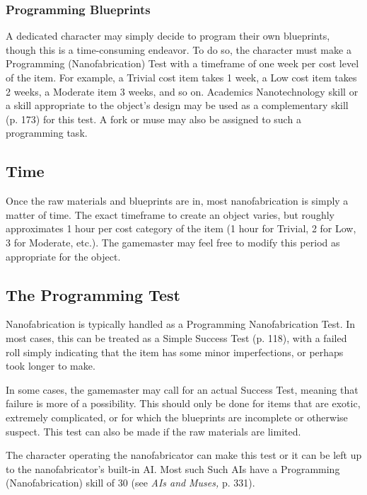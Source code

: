 \subsubsection{Programming Blueprints}

A dedicated character may simply decide to program 
their own blueprints, though this is a time-consuming 
endeavor. To do so, the character must make a Programming
(Nanofabrication) Test with a timeframe
of one week per cost level of the item. For example, a 
Trivial cost item takes 1 week, a Low cost item takes 2 
weeks, a Moderate item 3 weeks, and so on. Academics
Nanotechnology skill or a skill appropriate to the
object's design may be used as a complementary skill 
(p. 173) for this test. A fork or muse may also be assigned
to such a programming task.

\subsection{Time}

Once the raw materials and blueprints are in, most nanofabrication
is simply a matter of time. The exact timeframe to create an
object varies, but roughly approximates 1 hour per cost category of 
the item (1 hour for Trivial, 2 for Low, 3 for Moderate, etc.). The 
gamemaster may feel free to modify this period as appropriate for 
the object.

\subsection{The Programming Test}

Nanofabrication is typically handled as a Programming Nanofabrication
Test. In most cases, this can be treated as a Simple Success
Test (p. 118), with a failed roll simply indicating that the item has 
some minor imperfections, or perhaps took longer to make.

In some cases, the gamemaster may call for an actual Success Test, 
meaning that failure is more of a possibility. This should only be 
done for items that are exotic, extremely complicated, or for which 
the blueprints are incomplete or otherwise suspect. This test can also 
be made if the raw materials are limited.

The character operating the nanofabricator can make this test or 
it can be left up to the nanofabricator's built-in AI. Most such Such 
AIs have a Programming (Nanofabrication) skill of 30 (see \textit{AIs and }
\textit{Muses,} p. 331).

